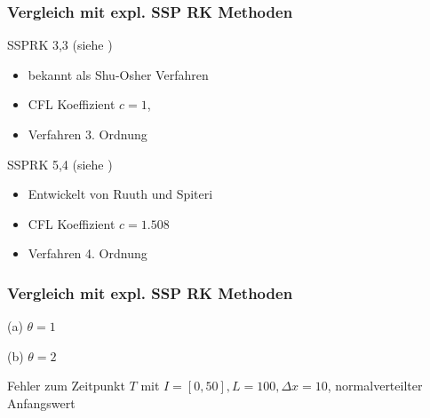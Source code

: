 \begin{frame}[<+->]
\frametitle{Vergleich mit expl. SSP RK Methoden}
\centering
\begin{block}{SSPRK 3,3 (siehe \cite[S. 110]{gottlieb2005high})}
\begin{itemize}
 \item bekannt als Shu-Osher Verfahren
 \item CFL Koeffizient $c =1$, 
 \item Verfahren 3. Ordnung
\end{itemize}
\end{block}
\begin{block}{SSPRK 5,4 (siehe \cite[S. 111]{gottlieb2005high})}
\begin{itemize}
 \item Entwickelt von Ruuth und Spiteri
 \item CFL Koeffizient $c =1.508$
 \item Verfahren 4. Ordnung
\end{itemize}
\end{block}
\end{frame}

\begin{frame}
\frametitle{Vergleich mit expl. SSP RK Methoden}
\centering
\begin{minipage}[b]{0.45\linewidth}
 \centering
 
(a) $\theta=1$
\end{minipage}
\begin{minipage}[b]{0.45\linewidth}
 \centering

(b) $\theta=2$
\end{minipage}
Fehler zum Zeitpunkt $T$ mit $I=[0,50], L=100,\Delta x = 10$, normalverteilter Anfangswert
\end{frame}
